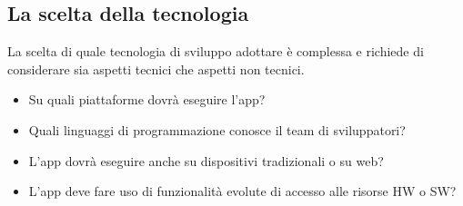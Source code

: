 \subsection{La scelta della tecnologia}
La scelta di quale tecnologia di sviluppo adottare è complessa e 
richiede di considerare sia aspetti tecnici che aspetti non tecnici. \begin{itemize}
    \item Su quali piattaforme dovrà eseguire l’app? 
    \item Quali linguaggi di programmazione conosce il team di sviluppatori? 
    \item L’app dovrà eseguire anche su dispositivi tradizionali o su web? 
    \item L’app deve fare uso di funzionalità evolute di accesso alle risorse HW o SW?
\end{itemize}